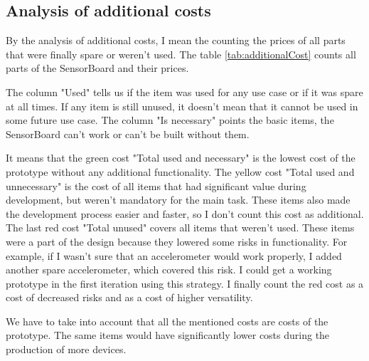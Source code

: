 \subsection{Analysis of additional costs}
\label{HWadditionalCosts}
By the analysis of additional costs, I mean the counting the prices of all parts that were finally spare or weren't used. The table \ref{tab:additionalCost} counts all parts of the SensorBoard and their prices.

The column "Used" tells us if the item was used for any use case or if it was spare at all times. If any item is still unused, it doesn't mean that it cannot be used in some future use case. The column "Is necessary" points the basic items, the SensorBoard can't work or can't be built without them.

It means that the green cost "Total used and necessary" is the lowest cost of the prototype without any additional functionality. The yellow cost "Total used and unnecessary" is the cost of all items that had significant value during development, but weren't mandatory for the main task. These items also made the development process easier and faster, so I don't count this cost as additional. The last red cost "Total unused" covers all items that weren't used. These items were a part of the design because they lowered some risks in functionality. For example, if I wasn't sure that an accelerometer would work properly, I added another spare accelerometer, which covered this risk. I could get a working prototype in the first iteration using this strategy. I finally count the red cost as a cost of decreased risks and as a cost of higher versatility.

We have to take into account that all the mentioned costs are costs of the prototype. The same items would have significantly lower costs during the production of more devices.

